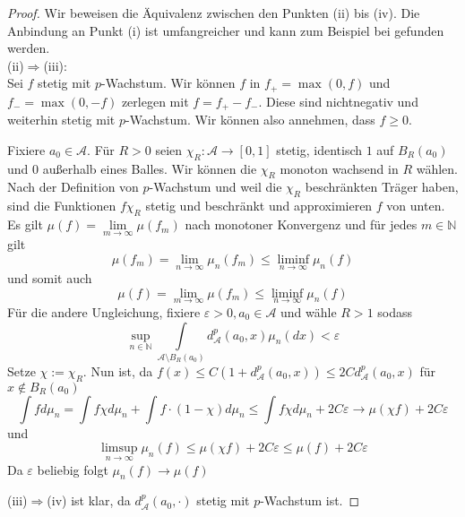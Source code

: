 \begin{proof}
Wir beweisen die Äquivalenz zwischen den Punkten (ii) bis (iv). Die Anbindung an Punkt (i) ist umfangreicher und kann zum Beispiel bei \cite[Satz 6.9]{villani} gefunden werden. \\ 

(ii)$\Rightarrow$(iii): \\
Sei $f$ stetig mit $p$-Wachstum. Wir können $f$ in $f_+ = \max(0, f)$ und $f_-=\max(0, -f)$ zerlegen mit $f=f_+-f_-$. Diese sind nichtnegativ und weiterhin stetig mit $p$-Wachstum. Wir können also annehmen, dass $f\geq 0$. 

Fixiere $a_0 \in \mathcal{A}$. Für $R>0$ seien $\chi_R:\mathcal{A}\rightarrow[0,1]$ stetig, identisch $1$ auf $B_R(a_0)$ und $0$ außerhalb eines Balles. Wir können die $\chi_R$ monoton wachsend in $R$ wählen. Nach der Definition von $p$-Wachstum und weil die $\chi_R$ beschränkten Träger haben, sind die Funktionen $f\chi_R$ stetig und beschränkt und approximieren $f$ von unten. Es gilt $\mu(f) = \lim\limits_{m\rightarrow \infty} \mu(f_m)$ nach monotoner Konvergenz und für jedes $m \in \mathbb{N}$ gilt 
$$\mu(f_m) = \lim\limits_{n\rightarrow\infty}\mu_n(f_m) \leq \liminf\limits_{n\rightarrow\infty}\mu_n(f)$$
und somit auch 
$$\mu(f) = \lim_{m\rightarrow\infty} \mu(f_m) \leq \liminf\limits_{n\rightarrow\infty}\mu_n(f)$$
Für die andere Ungleichung, fixiere $\varepsilon>0, a_0 \in \mathcal{A}$ und wähle $R>1$ sodass
$$\sup\limits_{n \in \mathbb{N}} \int\limits_{\mathcal{A}\setminus B_R(a_0)}d_\mathcal{A}^p(a_0, x)\mu_n(dx) < \varepsilon$$
Setze $\chi:=\chi_R$.
Nun ist, da $f(x)\leq C(1+d_\mathcal{A}^p(a_0, x)) \leq 2Cd_\mathcal{A}^p(a_0, x)$ für  $x\notin B_R(a_0)$ 
$$\int fd\mu_n = \int f\chi d\mu_n + \int f\cdot(1-\chi)d\mu_n \leq \int f\chi d\mu_n + 2C\varepsilon \rightarrow \mu(\chi f) + 2C\varepsilon$$
und 
$$\limsup_{n\rightarrow\infty}\mu_n(f) \leq \mu(\chi f) + 2C\varepsilon \leq \mu(f) + 2C\varepsilon$$
Da $\varepsilon$ beliebig folgt $\mu_n(f) \rightarrow \mu(f)$

(iii)$\Rightarrow$(iv) ist klar, da $d^p_\mathcal{A}(a_0, \cdot)$ stetig mit $p$-Wachstum ist.


\end{proof}
